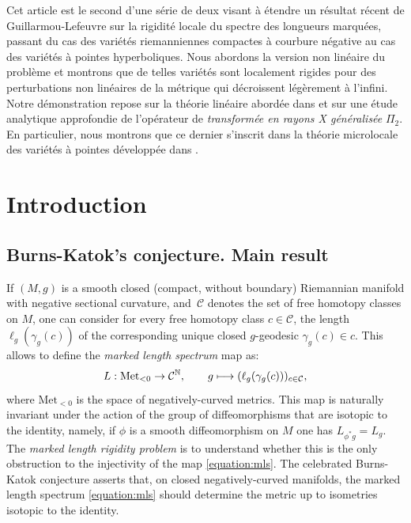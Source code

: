 \documentclass[JEP,XML,SOM,Unicode,NoFloatCountersInSection]{cedram}
\newcommand\mto{\mathchoice{\longmapsto}{\mapsto}{\mapsto}{\mapsto}}
\newcommand{\N}{\mathbb{N}}
\newcommand{\mc}{\mathcal}
\theoremstyle{plain}
\theoremstyle{definition}
\begin{document}

\begin{altabstract}
Cet article est le second d'une série de deux visant à étendre un résultat récent de Guillarmou-Lefeuvre \cite{Guillarmou-Lefeuvre-18} sur la rigidité locale du spectre des longueurs marquées, passant du cas des variétés riemanniennes compactes à courbure négative au cas des variétés à pointes hyperboliques. Nous abordons la version non linéaire du problème et montrons que de telles variétés sont localement rigides pour des perturbations non linéaires de la métrique qui décroissent légèrement à l'infini. Notre démonstration repose sur la théorie linéaire abordée dans \cite{Bonthonneau-Lefeuvre-19-1} et sur une étude analytique approfondie de l'opérateur de \emph{transformée en rayons X généralisée} $\Pi_2$. En particulier, nous montrons que ce dernier s'inscrit dans la théorie microlocale des variétés à pointes développée dans \cite{Bonthonneau-16, Bonthonneau-Weich-17, Bonthonneau-Lefeuvre-19-1}.
\end{altabstract}

\maketitle
\vspace*{-\baselineskip}
\tableofcontents
\mainmatter

\section{Introduction}

\subsection{Burns-Katok's conjecture. Main result}

If $(M,g)$ is a smooth closed (compact, without boundary) Riemannian manifold with negative sectional curvature, and~$\mc{C}$ denotes the set of free homotopy classes on $M$, one can consider for every free homotopy class $c \in \mc{C}$, the length $\ell_g(\gamma_g(c))$ of the corresponding unique closed $g$-geodesic $\gamma_g(c) \in c$. This allows to define the \emph{marked length spectrum} map as:
\begin{equation}
\label{equation:mls}
L : \mathrm{Met}_{< 0} \to \mc{C}^\N, \qquad g \mto (\ell_g(\gamma_g(c)))_{c \in \mc{C}},
\end{equation}
where $\mathrm{Met}_{< 0}$ is the space of negatively-curved metrics. This map is naturally invariant under the action of the group of diffeomorphisms that are isotopic to the identity, namely, if $\phi$ is a smooth diffeomorphism on $M$ one has $L_{\phi^*g}=L_{g}$. The \emph{marked length rigidity problem} is to understand whether this is the only obstruction to the injectivity of the map \eqref{equation:mls}. The celebrated Burns-Katok conjecture \cite{Burns-Katok-85} asserts that, on closed negatively-curved manifolds, the marked length spectrum \eqref{equation:mls} should determine the metric up to isometries isotopic to the identity.
\end{document}
